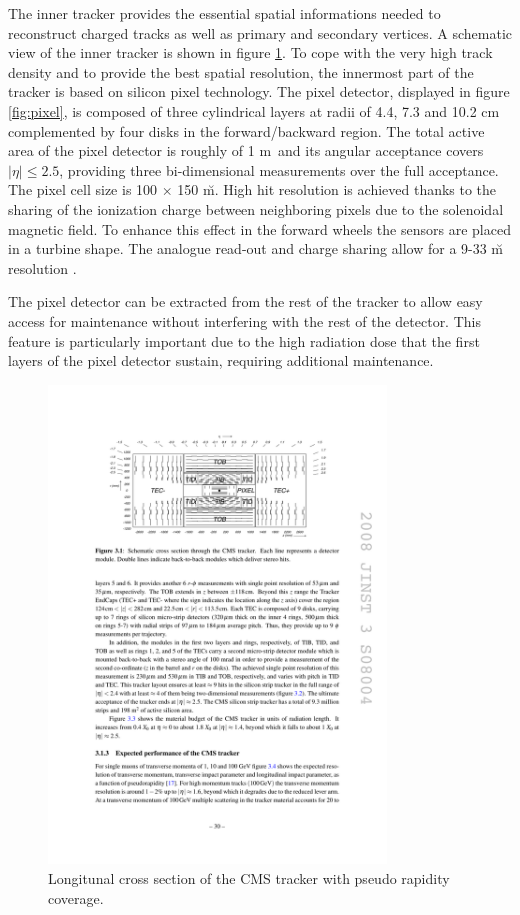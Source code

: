 The inner tracker provides the essential spatial informations needed to reconstruct charged tracks as well as primary and secondary vertices. A schematic view of the inner tracker is shown in figure \ref{fig:tracker}. To cope with the very high track density and to provide the best spatial resolution, the innermost part of the tracker is based on silicon pixel technology. The pixel detector, displayed in figure \ref{fig:pixel}, is composed of three cylindrical layers at radii of 4.4, 7.3 and 10.2 cm complemented by four disks  in the forward/backward region. The total active area of the pixel detector is roughly of 1 m\sq~and its angular acceptance covers $|\eta| \leq 2.5$, providing three bi-dimensional measurements over the full acceptance. The pixel cell size is 100 $\times$ 150 \u m\sq. High hit resolution is achieved thanks to the sharing of the ionization charge between neighboring pixels due to the solenoidal magnetic field. To enhance this effect in the forward wheels the sensors are placed in a turbine shape. The analogue read-out and charge sharing allow for a 9-33 \u m resolution \cite{trackingpaper}. 

The pixel detector can be extracted from the rest of the tracker to allow easy access for maintenance without interfering with the rest of the detector. This feature is particularly important due to the high radiation dose that the first layers of the pixel detector sustain, requiring additional maintenance.

\begin{figure}
\begin{center}
\includegraphics[angle=-0,width=0.8\textwidth]{2_LHC_and_CMS/pics/trkxsec.pdf}
\caption{Longitunal cross section of the CMS tracker with pseudo rapidity coverage. 
\label{fig:tracker}
}
\end{center}
\end{figure}

